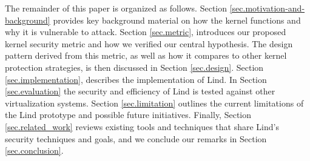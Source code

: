The remainder of this paper is organized as follows.
Section \ref{sec.motivation-and-background} provides key background material on
how the kernel functions and why it is vulnerable to attack.
Section \ref{sec.metric}, introduces our proposed kernel security metric and how
we verified our central hypothesis. The
design pattern derived from this metric, as well as how it compares to other kernel
protection strategies,
is then discussed in Section \ref{sec.design}. Section \ref{sec.implementation},
describes the implementation of Lind. In Section \ref{sec.evaluation} the security and
efficiency of Lind is tested against other virtualization systems.
Section \ref{sec.limitation} outlines the current
limitations of the Lind prototype and possible future initiatives.
Finally, Section \ref{sec.related_work} reviews existing tools and techniques that share
Lind's security techniques and goals, and we conclude our remarks in
Section \ref{sec.conclusion}.






